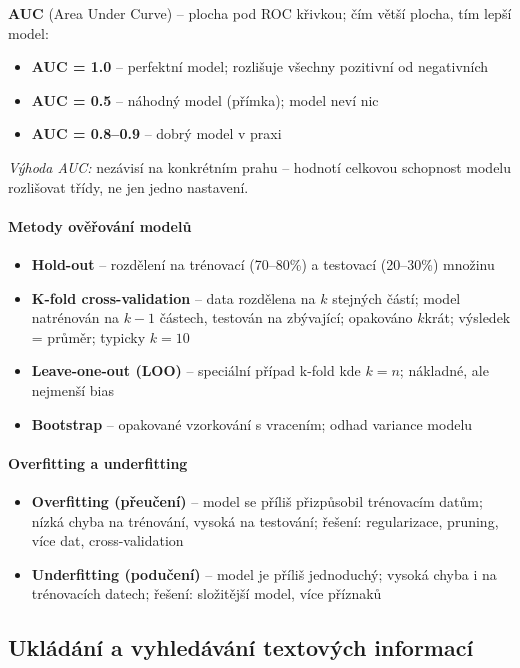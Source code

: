 \textbf{AUC} (Area Under Curve) -- plocha pod ROC křivkou; čím větší plocha, tím lepší model:
\begin{itemize}
  \item \textbf{AUC = 1.0} -- perfektní model; rozlišuje všechny pozitivní od negativních
  \item \textbf{AUC = 0.5} -- náhodný model (přímka); model neví nic
  \item \textbf{AUC = 0.8--0.9} -- dobrý model v praxi
\end{itemize}
\textit{Výhoda AUC:} nezávisí na konkrétním prahu -- hodnotí celkovou schopnost modelu rozlišovat třídy, ne jen jedno nastavení.

\paragraph{Metody ověřování modelů}
\begin{itemize}
  \item \textbf{Hold-out} -- rozdělení na trénovací (70--80\%) a testovací (20--30\%) množinu
  \item \textbf{K-fold cross-validation} -- data rozdělena na $k$ stejných částí; model natrénován na $k-1$ částech,
    testován na zbývající; opakováno $k$krát; výsledek = průměr; typicky $k=10$
  \item \textbf{Leave-one-out (LOO)} -- speciální případ k-fold kde $k=n$; nákladné, ale nejmenší bias
  \item \textbf{Bootstrap} -- opakované vzorkování s vracením; odhad variance modelu
\end{itemize}

\paragraph{Overfitting a underfitting}
\begin{itemize}
  \item \textbf{Overfitting (přeučení)} -- model se příliš přizpůsobil trénovacím datům; nízká chyba na trénování,
    vysoká na testování; řešení: regularizace, pruning, více dat, cross-validation
  \item \textbf{Underfitting (podučení)} -- model je příliš jednoduchý; vysoká chyba i na trénovacích datech;
    řešení: složitější model, více příznaků
\end{itemize}

\subsection{Ukládání a vyhledávání textových informací}

